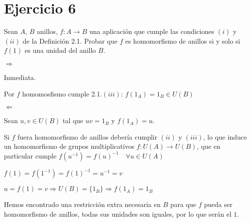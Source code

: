 \documentclass[10pt,a4paper]{article}
\begin{document}
	
	\section{Ejercicio 6}
	
	Sean $A,\, B$ anillos, $f:A\rightarrow B$ una aplicación que cumple las condiciones $(i)$ y $(ii)$ de la Definición 2.1. Probar que $f$ es homomorfismo de anillos si y solo si $f(1)$ es una unidad del anillo $B$.
	
	\hfill
	
	$\Rightarrow$
	
	Inmediata.
	
	Por $f$ homomosfismo cumple 2.1.$(iii)$: $f(1_A) = 1_B \in U\left( B \right)$
	
	
	\hfill
	
	
	$\Leftarrow$
	
	Sean $u,v\in U(B)$ tal que $uv=1_B$ y $f(1_A)=u$.
	
	 Si $f$ fuera homomorfismo de anillos debería cumplir $(ii)$ y $(iii)$, lo que  induce un homomorfismo de grupos multiplicativos $f \colon U(A) \rightarrow U(B)$, que en particular cumple $ f(u^{-1})=f(u)^{-1} \quad \forall u \in U(A)$
	 
	 $f(1) = f(1^{-1}) = f(1)^{-1} = u ^{-1} = v $
	 
	 $u = f(1) = v \Rightarrow U(B) = \{1_B\} \Rightarrow f(1_A) = 1_B$
	 
	 Hemos encontrado una restricción extra necesaria en $B$ para que $f$ pueda ser homomorfismo de anillos, todas sus unidades son iguales, por lo que serán el $1$. 
	
	
	\hfill
	
	
	
\end{document}
